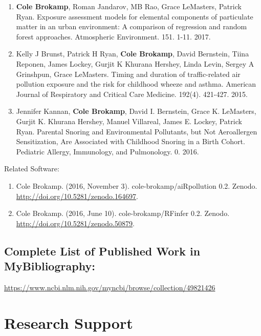 \documentclass{nihbiosketch}
\begin{document}
\begin{enumerate}
	
\item \textbf{Cole Brokamp}, Roman Jandarov, MB Rao, Grace LeMasters, Patrick Ryan. Exposure assessment models for elemental components of particulate matter in an urban environment: A comparison of regression and random forest approaches. Atmospheric Environment. 151. 1-11. 2017.

\item Kelly J Brunst, Patrick H Ryan, \textbf{Cole Brokamp}, David Bernstein, Tiina Reponen, James Lockey, Gurjit K Khurana Hershey, Linda Levin, Sergey A Grinshpun, Grace LeMasters. Timing and duration of traffic-related air pollution exposure and the risk for childhood wheeze and asthma. American Journal of Respiratory and Critical Care Medicine. 192(4). 421-427. 2015.

\item Jennifer Kannan, \textbf{Cole Brokamp}, David I. Bernstein, Grace K. LeMasters, Gurjit K. Khurana Hershey, Manuel Villareal, James E. Lockey, Patrick Ryan. Parental Snoring and Environmental Pollutants, but Not Aeroallergen Sensitization, Are Associated with Childhood Snoring in a Birth Cohort. Pediatric Allergy, Immunology, and Pulmonology. 0. 2016.

\end{enumerate}

\noindent Related Software:

\begin{enumerate}

\item Cole Brokamp. (2016, November 3). cole-brokamp/aiRpollution 0.2. Zenodo. \url{http://doi.org/10.5281/zenodo.164697}.

\item Cole Brokamp. (2016, June 10). cole-brokamp/RFinfer 0.2. Zenodo. \url{http://doi.org/10.5281/zenodo.50879}.

\end{enumerate}


\subsection*{Complete List of Published Work in MyBibliography:} 
\url{https://www.ncbi.nlm.nih.gov/myncbi/browse/collection/49821426}



\section{Research Support}
\end{document}
